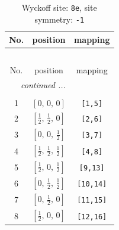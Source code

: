 \documentclass[fleqn,8pt]{jsarticle}
\begin{document}
\renewcommand{\arraystretch}{1.2}
\begin{longtable}{ccc}
\caption{Wyckoff site: {\tt 8e}, site symmetry: {\tt -1}}
 \\
 \hline \hline
No. & position & mapping \\ \hline \endfirsthead

\multicolumn{2}{l}{\tablename\ \thetable{}} \\
 \hline \hline
No. & position & mapping \\ \hline \endhead

 \hline \hline
\multicolumn{2}{r}{\footnotesize\it continued ...} \\ \endfoot

 \hline \hline
\multicolumn{2}{r}{} \\ \endlastfoot

1 & $\left[ 0,\, 0,\, 0 \right]$ & {\tt [1,5]} \\ \hline
2 & $\left[ \frac{1}{2},\, \frac{1}{2},\, 0 \right]$ & {\tt [2,6]} \\ \hline
3 & $\left[ 0,\, 0,\, \frac{1}{2} \right]$ & {\tt [3,7]} \\ \hline
4 & $\left[ \frac{1}{2},\, \frac{1}{2},\, \frac{1}{2} \right]$ & {\tt [4,8]} \\ \hline
5 & $\left[ \frac{1}{2},\, 0,\, \frac{1}{2} \right]$ & {\tt [9,13]} \\ \hline
6 & $\left[ 0,\, \frac{1}{2},\, \frac{1}{2} \right]$ & {\tt [10,14]} \\ \hline
7 & $\left[ 0,\, \frac{1}{2},\, 0 \right]$ & {\tt [11,15]} \\ \hline
8 & $\left[ \frac{1}{2},\, 0,\, 0 \right]$ & {\tt [12,16]} \\
\end{longtable}
\renewcommand{\arraystretch}{1.2}
\end{document}
